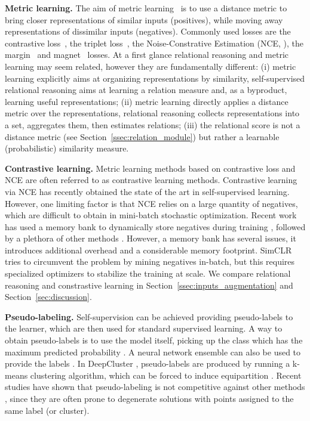 \documentclass{article}
\begin{document}
\textbf{Metric learning.} The aim of metric learning~\citep{bromley1994signature} is to use a distance metric to bring closer representations of similar inputs (positives), while moving away representations of dissimilar inputs (negatives). Commonly used losses are the contrastive loss~\citep{hadsell2006dimensionality}, the
triplet loss~\citep{weinberger2006distance}, the Noise-Constrative Estimation (NCE, \citealt{gutmann2010noise}), the margin~\citep{schroff2015facenet} and magnet~\citep{rippel2016metric} losses.
At a first glance relational reasoning and metric learning may seem related, however they are fundamentally different: 
(i) metric learning explicitly aims at organizing representations by similarity, self-supervised relational reasoning aims at learning a relation measure and, as a byproduct, learning useful representations; (ii) metric learning directly applies a distance metric over the representations, relational reasoning collects representations into a set, aggregates them, then estimates relations; (iii) the relational score is not a distance metric (see Section~\ref{ssec:relation_module}) but rather a learnable (probabilistic) similarity measure.

\textbf{Contrastive learning.} Metric learning methods based on contrastive loss and NCE are often referred to as contrastive learning methods.
Contrastive learning via NCE has recently obtained the state of the art in self-supervised learning. However, one limiting factor is that NCE relies on a large quantity of negatives, which are difficult to obtain in mini-batch stochastic optimization. Recent work has used a memory bank to dynamically store negatives during training \citep{wu2018unsupervised}, followed by a plethora of other methods \citep{he2019momentum,tian2019contrastive, misra2019self,zhuang2019local}. However, a memory bank has several issues, it introduces additional overhead and a considerable memory footprint. SimCLR \citep{chen2020simple} tries to circumvent the problem by mining negatives in-batch, but this requires specialized optimizers to stabilize the training at scale.
We compare relational reasoning and constrastive learning in Section~\ref{ssec:inputs_augmentation} and Section~\ref{sec:discussion}.

\textbf{Pseudo-labeling.} Self-supervision can be achieved providing pseudo-labels to the learner, which are then used for standard supervised learning. A way to obtain pseudo-labels is to use the model itself, picking up the class which has the maximum predicted probability \citep{lee2013pseudo, sohn2020fixmatch}.
A neural network ensemble can also be used to provide the labels \citep{gupta2020unsupervised}.
In DeepCluster \citep{caron2018deep}, pseudo-labels are produced by running a k-means clustering algorithm, which can be forced to induce equipartition \citep{asano2020self}. Recent studies have shown that pseudo-labeling is not competitive against other methods \citep{oliver2018realistic}, since they are often prone to degenerate solutions with points assigned to the same label (or cluster).
\end{document}
